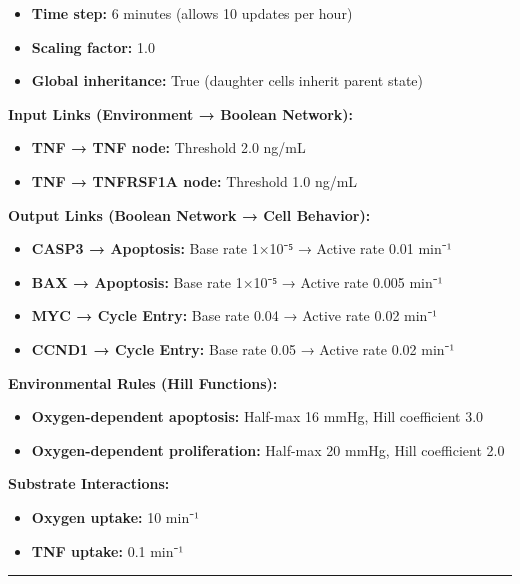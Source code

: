 \begin{itemize}
\tightlist
\item
  \textbf{Time step:} 6 minutes (allows 10 updates per hour)
\item
  \textbf{Scaling factor:} 1.0
\item
  \textbf{Global inheritance:} True (daughter cells inherit parent
  state)
\end{itemize}

\textbf{Input Links (Environment → Boolean Network):}

\begin{itemize}
\tightlist
\item
  \textbf{TNF → TNF node:} Threshold 2.0 ng/mL
\item
  \textbf{TNF → TNFRSF1A node:} Threshold 1.0 ng/mL
\end{itemize}

\textbf{Output Links (Boolean Network → Cell Behavior):}

\begin{itemize}
\tightlist
\item
  \textbf{CASP3 → Apoptosis:} Base rate 1×10⁻⁵ → Active rate 0.01 min⁻¹
\item
  \textbf{BAX → Apoptosis:} Base rate 1×10⁻⁵ → Active rate 0.005 min⁻¹
\item
  \textbf{MYC → Cycle Entry:} Base rate 0.04 → Active rate 0.02 min⁻¹
\item
  \textbf{CCND1 → Cycle Entry:} Base rate 0.05 → Active rate 0.02 min⁻¹
\end{itemize}

\textbf{Environmental Rules (Hill Functions):}

\begin{itemize}
\tightlist
\item
  \textbf{Oxygen-dependent apoptosis:} Half-max 16 mmHg, Hill
  coefficient 3.0
\item
  \textbf{Oxygen-dependent proliferation:} Half-max 20 mmHg, Hill
  coefficient 2.0
\end{itemize}

\textbf{Substrate Interactions:}

\begin{itemize}
\tightlist
\item
  \textbf{Oxygen uptake:} 10 min⁻¹
\item
  \textbf{TNF uptake:} 0.1 min⁻¹
\end{itemize}

\begin{center}\rule{0.5\linewidth}{0.5pt}\end{center}


